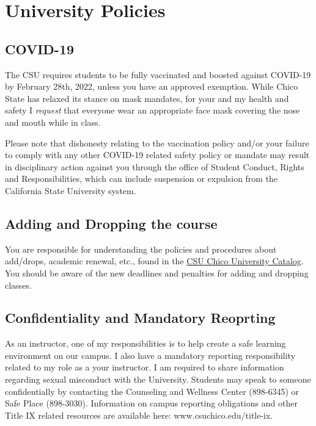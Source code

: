\documentclass[
  letterpaper,
  DIV=11,
  numbers=noendperiod]{scrartcl}
\begin{document}
\hypertarget{university-policies}{%
\section{University Policies}\label{university-policies}}

\hypertarget{covid-19}{%
\subsection{COVID-19}\label{covid-19}}

The CSU requires students to be fully vaccinated and boosted against
COVID-19 by February 28th, 2022, unless you have an approved exemption.
While Chico State has relaxed its stance on mask mandates, for your and
my health and safety I \emph{request} that everyone wear an appropriate
face mask covering the nose and mouth while in class.

Please note that dishonesty relating to the vaccination policy and/or
your failure to comply with any other COVID-19 related safety policy or
mandate may result in disciplinary action against you through the office
of Student Conduct, Rights and Responsibilities, which can include
suspension or expulsion from the California State University system.

\hypertarget{adding-and-dropping-the-course}{%
\subsection{Adding and Dropping the
course}\label{adding-and-dropping-the-course}}

You are responsible for understanding the policies and procedures about
add/drops, academic renewal, etc., found in the
\href{http://www.csuchico.edu/catalog/}{CSU Chico University Catalog}.
You should be aware of the new deadlines and penalties for adding and
dropping classes.

\hypertarget{confidentiality-and-mandatory-reoprting}{%
\subsection{Confidentiality and Mandatory
Reoprting}\label{confidentiality-and-mandatory-reoprting}}

As an instructor, one of my responsibilities is to help create a safe
learning environment on our campus. I also have a mandatory reporting
responsibility related to my role as a your instructor. I am required to
share information regarding sexual misconduct with the University.
Students may speak to someone confidentially by contacting the
Counseling and Wellness Center (898-6345) or Safe Place (898-3030).
Information on campus reporting obligations and other Title IX related
resources are available here: www.csuchico.edu/title-ix.
\end{document}
